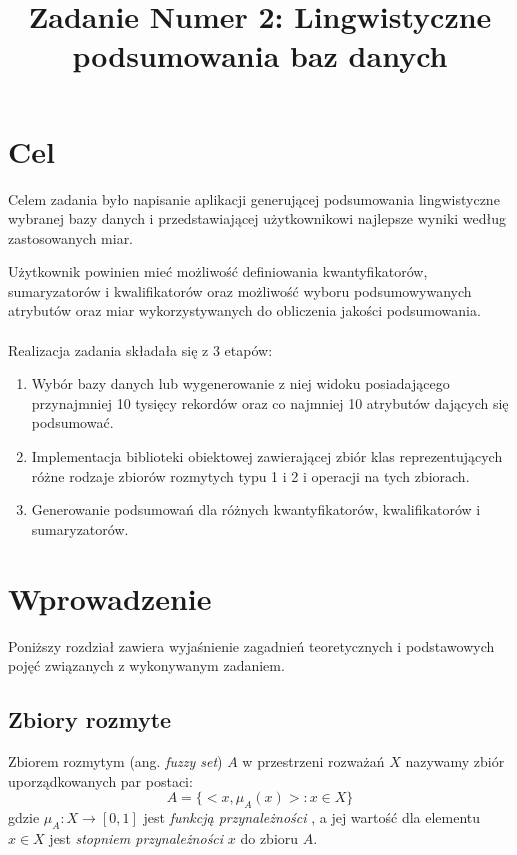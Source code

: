 \documentclass{classrep}
\author{
  \studentinfo{Michał Janiszewski}{169485} \and
  \studentinfo{Mariusz Łucka}{169493}
}
\title{Zadanie Numer 2: Lingwistyczne podsumowania baz danych}
\begin{document}
\maketitle

\section{Cel}
Celem zadania było napisanie aplikacji generującej podsumowania lingwistyczne wybranej bazy danych i przedstawiającej użytkownikowi najlepsze wyniki według zastosowanych miar.

Użytkownik powinien mieć możliwość definiowania kwantyfikatorów, sumaryzatorów i kwalifikatorów oraz możliwość wyboru podsumowywanych atrybutów oraz miar wykorzystywanych do obliczenia jakości podsumowania.

\paragraph{}
Realizacja zadania składała się z 3 etapów:  
\begin{enumerate}
\item Wybór bazy danych lub wygenerowanie z niej widoku posiadającego przynajmniej 10 tysięcy rekordów oraz co najmniej 10 atrybutów dających się podsumować.

\item Implementacja biblioteki obiektowej zawierającej zbiór klas reprezentujących różne rodzaje zbiorów rozmytych typu 1 i 2 i operacji na tych zbiorach. 

\item Generowanie podsumowań dla różnych kwantyfikatorów, kwalifikatorów i sumaryzatorów.
\end{enumerate}


\section{Wprowadzenie}
Poniższy rozdział zawiera wyjaśnienie zagadnień teoretycznych i podstawowych pojęć związanych z wykonywanym zadaniem.

\subsection{Zbiory rozmyte}
Zbiorem rozmytym (ang. \textit{fuzzy set}) $A$ w przestrzeni rozważań $X$ nazywamy zbiór uporządkowanych par postaci:
\begin{equation}
A=\{<x, \mu_A(x)>:x \in X \}
\end{equation}
gdzie $\mu_A:X \rightarrow [0,1] $ jest \textit{funkcją przynależności} , a jej wartość dla elementu $x \in X$ jest \textit{stopniem przynależności} $x$ do zbioru $A$.
\end{document}
